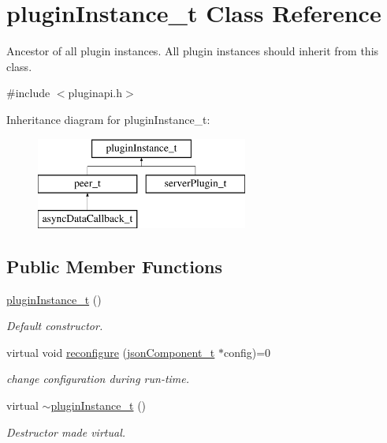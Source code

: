 \hypertarget{classpluginInstance__t}{\section{plugin\-Instance\-\_\-t \-Class \-Reference}
\label{classpluginInstance__t}
}


\-Ancestor of all plugin instances. \-All plugin instances should inherit from this class.  




{\ttfamily \#include $<$pluginapi.\-h$>$}

\-Inheritance diagram for plugin\-Instance\-\_\-t\-:\begin{figure}[H]
\begin{center}
\leavevmode
\includegraphics[height=3.000000cm]{classpluginInstance__t}
\end{center}
\end{figure}
\subsection*{\-Public \-Member \-Functions}
\begin{DoxyCompactItemize}
\item 
\hypertarget{classpluginInstance__t_a4e74ae8a2a9b9655d9de35f423d49152}{\hyperlink{classpluginInstance__t_a4e74ae8a2a9b9655d9de35f423d49152}{plugin\-Instance\-\_\-t} ()}\label{classpluginInstance__t_a4e74ae8a2a9b9655d9de35f423d49152}

\begin{DoxyCompactList}\small\item\em \-Default constructor. \end{DoxyCompactList}\item 
virtual void \hyperlink{classpluginInstance__t_a81df28e84fba35ab9d2c2dacc94dfebb}{reconfigure} (\hyperlink{classjsonComponent__t}{json\-Component\-\_\-t} $\ast$config)=0
\begin{DoxyCompactList}\small\item\em change configuration during run-\/time. \end{DoxyCompactList}\item 
virtual \hyperlink{classpluginInstance__t_a92a1080a37261387f4b823ef6fadea38}{$\sim$plugin\-Instance\-\_\-t} ()
\begin{DoxyCompactList}\small\item\em \-Destructor made virtual. \end{DoxyCompactList}\end{DoxyCompactItemize}


